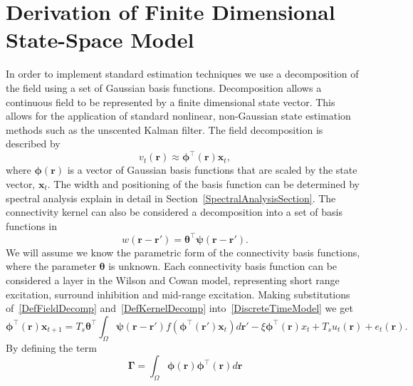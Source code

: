 \documentclass[12pt]{iopart}		%
\begin{document}
\section{Derivation of Finite Dimensional State-Space Model}
In order to implement standard estimation techniques we use a decomposition of the field using a set of Gaussian basis functions. Decomposition allows a continuous field to be represented by a finite dimensional state vector. This allows for the application of standard nonlinear, non-Gaussian state estimation methods such as the unscented Kalman filter. The field decomposition is described by
\begin{equation}\label{DefFieldDecomp}
	v_t\left(\mathbf{r}\right) \approx \boldsymbol{\phi}^{\top}\left(\mathbf{r}\right) \mathbf{x}_t,
\end{equation}
where $\mathbf{\boldsymbol{\phi}}(\mathbf{r})$ is a vector of Gaussian basis functions that are scaled by the state vector, $\mathbf{x}_t$. The width and positioning of the basis function can be determined by spectral analysis explain in detail in Section~\ref{SpectralAnalysisSection}. The connectivity kernel can also be considered a decomposition into a set of basis functions in 
\begin{equation}\label{DefKernelDecomp}
	w\left(\mathbf{r}-\mathbf{r}'\right) = \boldsymbol{\theta}^{\top} \boldsymbol{\psi}\left(\mathbf{r}-\mathbf{r}'\right).
\end{equation}
We will assume we know the parametric form of the connectivity basis functions, where the parameter $\boldsymbol{\theta}$ is unknown. Each connectivity basis function can be considered a layer in the Wilson and Cowan model, representing short range excitation, surround inhibition and mid-range excitation. Making substitutions of~\ref{DefFieldDecomp} and~\ref{DefKernelDecomp} into~\ref{DiscreteTimeModel} we get
\begin{equation}\label{reduced continuous model}
	\boldsymbol{\phi}^{\top}\left( \mathbf{r} \right) \mathbf{x}_{t+1} = T_s\boldsymbol{\theta}^{\top}\int_\Omega  {\boldsymbol{\psi} \left(\mathbf{r}-\mathbf{r}'\right) f\left( \boldsymbol{\phi} ^{\top}\left(\mathbf{r}'\right)\mathbf{x}_t \right)d\mathbf{r}'}  - \xi\boldsymbol{\phi}^{\top}\left(\mathbf{r}\right)x_t + T_s u_t\left(\mathbf{r}\right) + e_t\left(\mathbf{r}\right).
\end{equation}
By defining the term
\begin{equation}\label{DefGamma}
	\boldsymbol{\Gamma}  = \int_\Omega  {\boldsymbol{\phi} \left(\mathbf{r}\right)\boldsymbol{\phi} ^{\top}\left(\mathbf{r}\right)d\mathbf{r}}
\end{equation}
\end{document}
